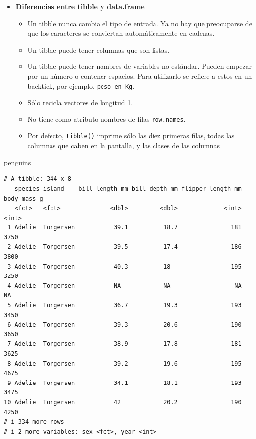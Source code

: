 \documentclass[
  letterpaper,
  DIV=11,
  numbers=noendperiod]{scrreprt}
\newenvironment{Shaded}{\begin{snugshade}}{\end{snugshade}}
\newcommand{\NormalTok}[1]{\textcolor[rgb]{0.00,0.23,0.31}{#1}}
\begin{document}
\begin{itemize}
\item
  \textbf{Diferencias entre tibble y data.frame}

  \begin{itemize}
  \item
    Un tibble nunca cambia el tipo de entrada. Ya no hay que preocuparse
    de que los caracteres se conviertan automáticamente en cadenas.
  \item
    Un tibble puede tener columnas que son listas.
  \item
    Un tibble puede tener nombres de variables no estándar. Pueden
    empezar por un número o contener espacios. Para utilizarlo se
    refiere a estos en un backtick, por ejemplo, \texttt{peso\ en\ Kg}.
  \item
    Sólo recicla vectores de longitud 1.
  \item
    No tiene como atributo nombres de filas \texttt{row.names}.
  \item
    Por defecto, \texttt{tibble()} imprime sólo las diez primeras filas,
    todas las columnas que caben en la pantalla, y las clases de las
    columnas
  \end{itemize}
\end{itemize}

\begin{Shaded}
\begin{Highlighting}[]
\NormalTok{penguins}
\end{Highlighting}
\end{Shaded}

\begin{verbatim}
# A tibble: 344 x 8
   species island    bill_length_mm bill_depth_mm flipper_length_mm body_mass_g
   <fct>   <fct>              <dbl>         <dbl>             <int>       <int>
 1 Adelie  Torgersen           39.1          18.7               181        3750
 2 Adelie  Torgersen           39.5          17.4               186        3800
 3 Adelie  Torgersen           40.3          18                 195        3250
 4 Adelie  Torgersen           NA            NA                  NA          NA
 5 Adelie  Torgersen           36.7          19.3               193        3450
 6 Adelie  Torgersen           39.3          20.6               190        3650
 7 Adelie  Torgersen           38.9          17.8               181        3625
 8 Adelie  Torgersen           39.2          19.6               195        4675
 9 Adelie  Torgersen           34.1          18.1               193        3475
10 Adelie  Torgersen           42            20.2               190        4250
# i 334 more rows
# i 2 more variables: sex <fct>, year <int>
\end{verbatim}
\end{document}
